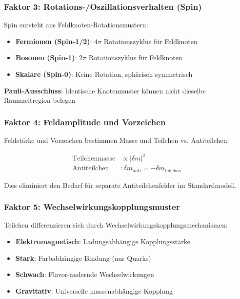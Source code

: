 	\subsubsection{Faktor 3: Rotations-/Oszillationsverhalten (Spin)}
	\label{subsubsec:spin_verhalten}
	
	Spin entsteht aus Feldknoten-Rotationsmustern:
	
	\begin{tcolorbox}[colback=green!5!white,colframe=green!75!black,title=Spin aus Feldknoten-Rotation]
		\begin{itemize}
			\item \textbf{Fermionen (Spin-1/2)}: $4\pi$ Rotationszyklus für Feldknoten
			\item \textbf{Bosonen (Spin-1)}: $2\pi$ Rotationszyklus für Feldknoten
			\item \textbf{Skalare (Spin-0)}: Keine Rotation, sphärisch symmetrisch
		\end{itemize}
		
		\textbf{Pauli-Ausschluss}: Identische Knotenmuster können nicht dieselbe Raumzeitregion belegen
	\end{tcolorbox}
	
	\subsubsection{Faktor 4: Feldamplitude und Vorzeichen}
	\label{subsubsec:feldamplitude}
	
	Feldstärke und Vorzeichen bestimmen Masse und Teilchen vs. Antiteilchen:
	
	\begin{align}
		\text{Teilchenmasse} &\propto |\delta m|^2 \\
		\text{Antiteilchen} &: \delta m_{\text{anti}} = -\delta m_{\text{teilchen}}
	\end{align}
	
	Dies eliminiert den Bedarf für separate Antiteilchenfelder im Standardmodell.
	
	\subsubsection{Faktor 5: Wechselwirkungskopplungsmuster}
	\label{subsubsec:kopplungsmuster}
	
	Teilchen differenzieren sich durch Wechselwirkungskopplungsmechanismen:
	\begin{itemize}
		\item \textbf{Elektromagnetisch}: Ladungsabhängige Kopplungsstärke
		\item \textbf{Stark}: Farbabhängige Bindung (nur Quarks)
		\item \textbf{Schwach}: Flavor-ändernde Wechselwirkungen
		\item \textbf{Gravitativ}: Universelle massenabhängige Kopplung
	\end{itemize}
	
